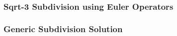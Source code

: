 \newcommand{\mySqrt}{$\sqrt{3}$}
\subsubsection*{Sqrt-3 Subdivision using Euler Operators}


\subsubsection*{Generic Subdivision Solution}



%

